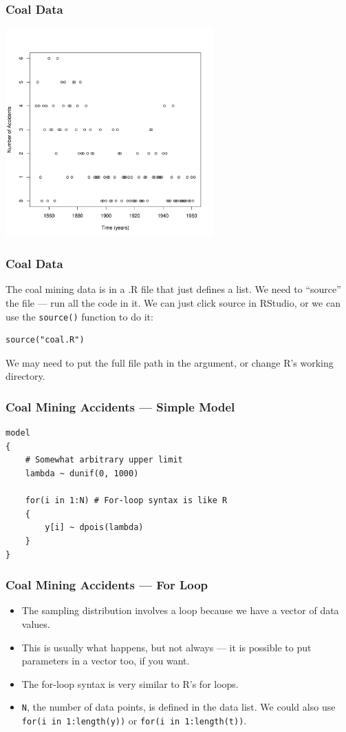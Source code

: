 \documentclass{beamer}
\begin{document}
\begin{frame}[fragile]
\frametitle{Coal Data}

\centering
\includegraphics[width=0.6\textwidth]{images/coal.pdf}

\end{frame}


\begin{frame}[fragile]
\frametitle{Coal Data}
The coal mining data is in a .R file that just defines a list.
We need to ``source'' the file --- run all the code in it. We can just
click source in RStudio, or we can use the \texttt{source()}
function to do it:
\begin{verbatim}
source("coal.R")
\end{verbatim}
\pause
We may need to put the full file path in the argument, or change
R's working directory.

\end{frame}




\begin{frame}[fragile]
\frametitle{Coal Mining Accidents --- Simple Model}

\begin{verbatim}
model
{
    # Somewhat arbitrary upper limit
    lambda ~ dunif(0, 1000)

    for(i in 1:N) # For-loop syntax is like R
    {
        y[i] ~ dpois(lambda)
    }
}
\end{verbatim}

\end{frame}


\begin{frame}[fragile]
\frametitle{Coal Mining Accidents --- For Loop}
\begin{itemize}
\item The sampling distribution involves a loop because we have a vector
of data values.\pause
\item This is usually what happens, but not always --- it is possible to
put parameters in a vector too, if you want.\pause
\item The for-loop syntax is very similar to R's for loops.\pause
\item \texttt{N}, the number of data points, is defined in the
data list. We could also use \texttt{for(i in 1:length(y))} or
\texttt{for(i in 1:length(t))}.
\end{itemize}

\end{frame}
\end{document}
